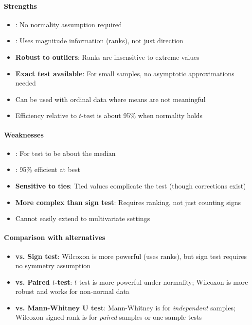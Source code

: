 \paragraph{Strengths}
\begin{itemize}
    \item {}: No normality assumption required
    \item {}: Uses magnitude information (ranks), not just direction
    \item \textbf{Robust to outliers}: Ranks are insensitive to extreme values
    \item \textbf{Exact test available}: For small samples, no asymptotic approximations needed
    \item Can be used with ordinal data where means are not meaningful
    \item Efficiency relative to $t$-test is about 95\% when normality holds
\end{itemize}

\paragraph{Weaknesses}
\begin{itemize}
    \item {}: For test to be about the median
    \item {}: 95\% efficient at best
    \item \textbf{Sensitive to ties}: Tied values complicate the test (though corrections exist)
    \item \textbf{More complex than sign test}: Requires ranking, not just counting signs
    \item Cannot easily extend to multivariate settings
\end{itemize}

\paragraph{Comparison with alternatives}
\begin{itemize}
    \item \textbf{vs. Sign test}: Wilcoxon is more powerful (uses ranks), but sign test requires
        no symmetry assumption
    \item \textbf{vs. Paired $t$-test}: $t$-test is more powerful under normality; Wilcoxon is
        more robust and works for non-normal data
    \item \textbf{vs. Mann-Whitney U test}: Mann-Whitney is for \emph{independent} samples;
        Wilcoxon signed-rank is for \emph{paired} samples or one-sample tests
\end{itemize}

